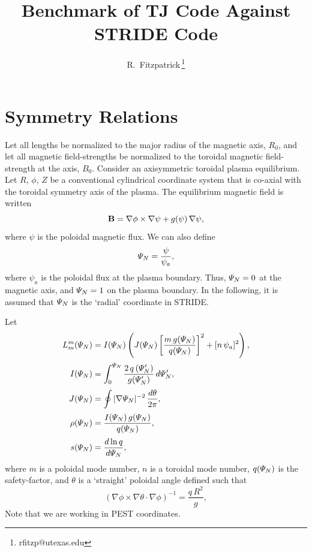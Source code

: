 \documentclass[12pt,prb,aps,notitlepage]{revtex4-1}
\begin{document}
\title{Benchmark of TJ Code Against STRIDE Code}
\author{R.~Fitzpatrick\,\footnote{rfitzp@utexas.edu}}
\begin{abstract}
\end{abstract}
\maketitle

\section{Symmetry Relations}
Let  all lengths be normalized to the major radius of the magnetic axis, $R_0$,  and let
all magnetic field-strengths be normalized to  the toroidal magnetic field-strength at the axis, $B_0$. 
Consider an axisymmetric toroidal plasma equilibrium. 
Let $R$, $\phi$, $Z$ be a conventional cylindrical coordinate system that is co-axial
with the toroidal symmetry axis of the plasma. 
The equilibrium magnetic field is written
\begin{equation}
{\bf B} =\nabla\phi\times \nabla\psi+g(\psi)\,\nabla\psi,
\end{equation}
where $\psi$ is the  poloidal magnetic flux. We can also
define 
\begin{equation}
{\mit\Psi}_N = \frac{\psi}{\psi_a},
\end{equation}
where $\psi_a$ is the poloidal flux at the plasma boundary. Thus, ${\mit\Psi}_N=0$ at the magnetic axis, and
${\mit\Psi}_N=1$ on the plasma boundary. In the following, it is assumed that ${\mit\Psi}_N$ is the `radial'
coordinate in STRIDE. 

Let
\begin{align}
L_m^m({\mit\Psi}_N) &= I({\mit\Psi}_N)\left( J({\mit\Psi}_N)\left[\frac{m\,g({\mit\Psi}_N)}{q({\mit\Psi}_N)}\right]^2+ [n\,\psi_a]^2\right),\\[0.5ex]
I({\mit\Psi}_N) &= \int_0^{{\mit\Psi}_N} \frac{2\,q\,({\mit\Psi}_N')}{g({\mit\Psi}_N')}\,d{\mit\Psi}_N',\\[0.5ex]
J({\mit\Psi}_N)&= \oint|\nabla{\mit\Psi}_N|^{-2}\,\frac{d\theta}{2\pi},\\[0.5ex]
\rho({\mit\Psi}_N) &= \frac{I({\mit\Psi}_N)\,g({\mit\Psi}_N)}{q({\mit\Psi}_N)},\\[0.5ex]
s({\mit\Psi}_N) &= \frac{d\ln q}{d{\mit\Psi}_N},
\end{align}
where $m$ is a poloidal mode number, $n$ is a toroidal mode number, $q({\mit\Psi}_N)$ is the safety-factor, and $\theta$ is
a `straight' poloidal  angle defined such that 
\begin{equation}
(\nabla\phi\times\nabla\theta\cdot\nabla\phi)^{-1} = \frac{q\,R^2}{g},
\end{equation}
Note that we are working in PEST coordinates. 
\end{document}
